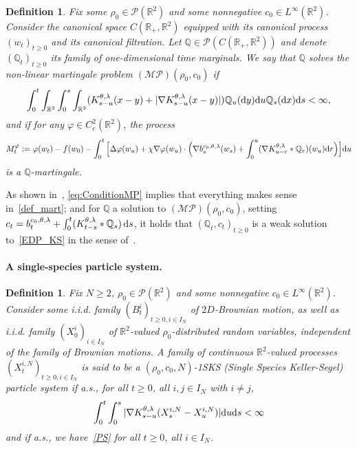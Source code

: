 \documentclass[11pt]{article}
\newtheorem{mydef}[theorem]{Definition}
\newcommand{\R}{\mathbb{R}}
\newcommand{\Q}{\mathbb{Q}}
\newcommand{\1}{\mathbbm{1}}
\newcommand{\dd}{{\rm d}}
\newcommand{\Pp}{\mathcal P}
\begin{document}
\begin{mydef}
\label{defMP}
Fix some $\rho_0 \in \Pp(\R^2)$ and some nonnegative $c_0\in L^\infty(\R^2)$. 
Consider the canonical space $C(\R_+,\R^2)$ equipped with its
canonical process $(w_t)_{t\geq 0}$ and its canonical filtration. Let $\Q \in \Pp(C(\R_+,\R^2))$
and denote $(\Q_t)_{t\geq 0}$ its family of one-dimensional time marginals. 
We say that $\Q$ solves the non-linear 
martingale problem $\mathcal{(MP)}(\rho_0,c_0)$ if
\begin{equation}
\label{eq:ConditionMP}
\int_0^t \int_{\R^2} \int_0^s \int_{\R^2}   (K^{\theta,\lambda}_{s-u}(x-y) + 
|\nabla K^{\theta,\lambda}_{s-u}(x-y)|) \Q_u(\dd y)  \dd u   \Q_s(\dd x) \dd s < \infty,
\end{equation}
and if for any $\varphi \in C_c^2(\R^2)$, the process
\begin{equation}
\label{def_mart}
M^\varphi_t:=\varphi(w_t)-f(w_0)-\int_0^t \Big[ \Delta \varphi(w_u)+\chi \nabla \varphi(w_u)\cdot 
\Big(\nabla b_s^{c_0,\theta,\lambda}(w_s) + \int_0^u (\nabla K^{\theta,\lambda}_{u-r}\ast \Q_r)(w_u) \dd r \Big) \Big]\dd u
\end{equation}
is a $\Q$-martingale.
\end{mydef}

As shown in~\cite[Section~1]{FT}, \eqref{eq:ConditionMP} implies that everything makes sense 
in~\eqref{def_mart}; and for $\Q$ a solution to $\mathcal{(MP)}(\rho_0,c_0)$,
setting $c_t=b_t^{c_0,\theta,\lambda}+ \int_0^t (K^{\theta,\lambda}_{t-s} \ast \Q_s )\,\dd s$, it holds that 
$(\Q_t,c_t)_{t\geq 0}$ is a weak solution to~\eqref{EDP_KS} in the sense of~\cite[Definition~1]{FT}.

\paragraph{A single-species particle system.}

\begin{mydef}\label{def:PS} Fix $N\geq 2$, $\rho_0 \in \Pp(\R^2)$ and some nonnegative
$c_0\in L^\infty(\R^2)$. Consider some i.i.d. family $(B_t^i)_{t\geq 0,i\in I_N}$ of $2D$-Brownian 
motion, as well as i.i.d. family 
$(X_0^i)_{i\in I_N}$ of $\R^2$-valued $\rho_0$-distributed random variables, 
independent of the family of Brownian motions. 
A family of continuous $\R^2$-valued processes $(X^{i,N}_t)_{t\geq 0,i\in I_N}$ is said to be a $(\rho_0,c_0,N)$-1SKS 
(Single Species Keller-Segel)
particle system if a.s., for all $t\geq 0$, all $i,j \in I_N$ with $i\neq j$,
\begin{align}
\label{PScond}
\int_0^t \int_0^s |\nabla K^{\theta,\lambda}_{s-u} ( X^{i,N}_s-X^{i,N}_u)|  \dd u \dd s<\infty 
\end{align}
and if a.s., we have~\eqref{PS} for all $t\geq 0$, all $i\in I_N$.
\end{mydef}
\end{document}
